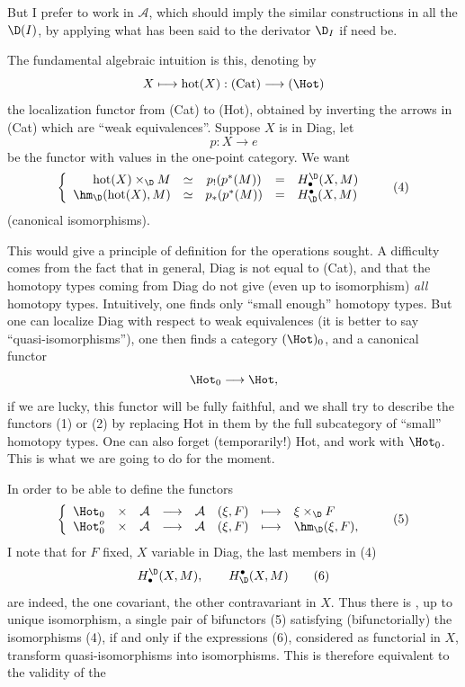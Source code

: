 But I prefer to work in $\mathcal{A}$, which should imply the similar constructions in all the $\D(I)$, by applying what has been said to the derivator $\D_I$ if need be.

The fundamental algebraic intuition is this, denoting by
\[
X \longmapsto \mathrm{hot}(X) : (\mathrm{Cat}) \longrightarrow (\Hot)
\]
the localization functor from (Cat) to (Hot), obtained by inverting the arrows in (Cat) which are ``weak equivalences''. Suppose $X$ is in Diag, let
\[
p : X \longrightarrow e
\]
be the functor with values in the one-point category. We want
\[
\left\{
\begin{array}{rcccl}
\mathrm{hot}(X) \times_{\D} M & \simeq & p_!(p^*(M)) & = & H^{\D}_{\bullet}(X, M)\\
\hm_{\D}(\mathrm{hot}(X), M) & \simeq & p_*(p^*(M)) & = & H^{\bullet}_{\D}(X, M)
\end{array}
\right.
\tag*{(4)}
\]
(canonical isomorphisms).

This would give a principle of definition for the operations sought. A difficulty comes from the fact that in general, Diag is not equal to (Cat), and that the homotopy types coming from Diag do not give (even up to isomorphism) \textit{all} homotopy types. Intuitively, one finds only ``small enough'' homotopy types. But one can localize Diag with respect to weak equivalences (it is better to say ``quasi-isomorphisms''), one then finds a category $(\Hot)_0$, and a canonical functor
\[
\Hot_0 \longrightarrow \Hot,
\]
if we are lucky, this functor will be fully faithful, and we shall try to describe the functors (1) or (2) by replacing Hot in them by the full subcategory of ``small'' homotopy types. One can also forget (temporarily!) Hot, and work with $\Hot_0$. This is what we are going to do for the moment.

In order to be able to define the functors
\[
\left\{
\begin{array}{lccccccl}
\Hot_0 & \times & \mathcal{A} & \longrightarrow & \mathcal{A} & (\xi, F) & \longmapsto & \xi \times_{\D} F\\
\Hot_0^o & \times & \mathcal{A} & \longrightarrow & \mathcal{A} & (\xi, F) & \longmapsto & \hm_{\D}(\xi, F),
\end{array}
\right.
\tag*{(5)}
\]
I note that for $F$ fixed, $X$ variable in Diag, the
last members in (4)
\[
H^{\D}_{\bullet}(X, M), \qquad H^{\bullet}_{\D}(X, M)
\tag*{(6)}
\]
are indeed, the one covariant, the other contravariant in $X$. Thus there is , up to unique isomorphism, a single pair of bifunctors (5) satisfying (bifunctorially) the isomorphisms (4), if and only if the expressions (6), considered as functorial in $X$, transform quasi-isomorphisms into isomorphisms. This is therefore equivalent to the validity of the %

